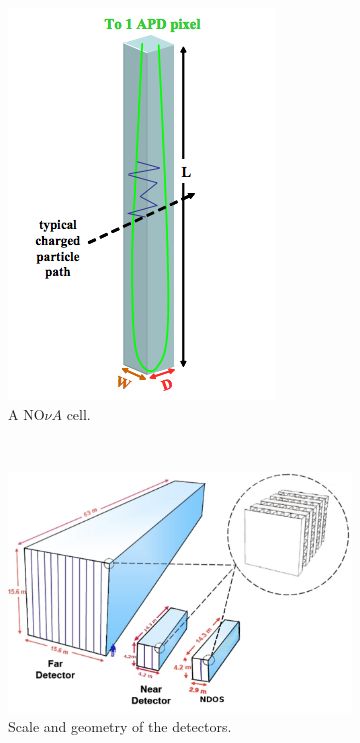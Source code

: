 \begin{figure}[t]
\begin{subfigure}[t]{0.25\textwidth}
                \includegraphics[height=0.35\textheight]{figures/figures/cell.png}
               \caption{A NO$\nu A$ cell.}
                 \label{cell}
        \end{subfigure}
        ~
\begin{subfigure}[t]{0.75\textwidth}
                \centering
                \includegraphics[height=0.35\textheight]{figures/figures/detectors.pdf}
               \caption{Scale and geometry of the \nova detectors.}
                \label{detector}

        \end{subfigure}
        \caption{}
\end{figure}

